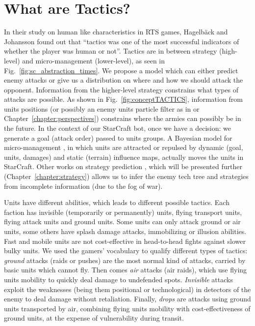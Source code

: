 \section{What are Tactics?}
In their study on human like characteristics in RTS games, Hagelb\"{a}ck and Johansson \cite{HagelbackCIG10} found out that ``tactics was one of the most successful indicators of whether the player was human or not''. Tactics are in between strategy (high-level) and micro-management (lower-level), as seen in Fig.~\ref{fig:sc_abstraction_times}. We propose a model which can either predict enemy attacks or give us a distribution on where and how we should attack the opponent. Information from the higher-level strategy constrains what types of attacks are possible. As shown in Fig.~\ref{fig:conceptTACTICS}, information from units positions (or possibly an enemy units particle filter as in \cite{weber2011aiide} or Chapter~\ref{chapter:perspectives}) constrains where the armies can possibly be in the future. In the context of our StarCraft bot, once we have a decision: we generate a goal (attack order) passed to units groups. %
A Bayesian model for micro-management \cite{SYNNAEVE:Micro}, in which units are attracted or repulsed by dynamic (goal, units, damages) and static (terrain) influence maps, actually moves the units in StarCraft. Other works on strategy prediction \cite{SYNNAEVE:StratPred,SYNNAEVE:OpeningPred}, which will be presented further (Chapter~\ref{chapter:strategy}) allows us to infer the enemy tech tree and strategies from incomplete information (due to the fog of war).


Units have different abilities, which leads to different possible tactics. Each faction has invisible (temporarily or permanently) units, flying transport units, flying attack units and ground units. Some units can only attack ground or air units, some others have splash damage attacks, immobilizing or illusion abilities. Fast and mobile units are not cost-effective in head-to-head fights against slower bulky units. We used the gamers' vocabulary to qualify different types of tactics: \textit{ground} attacks (raids or pushes) are the most normal kind of attacks, carried by basic units which cannot fly. Then comes \textit{air} attacks (air raids), which use flying units mobility to quickly deal damage to undefended spots. \textit{Invisible} attacks exploit the weaknesses (being them positional or technological) in detectors of the enemy to deal damage without retaliation. Finally, \textit{drops} are attacks using ground units transported by air, combining flying units mobility with cost-effectiveness of ground units, at the expense of vulnerability during transit.


